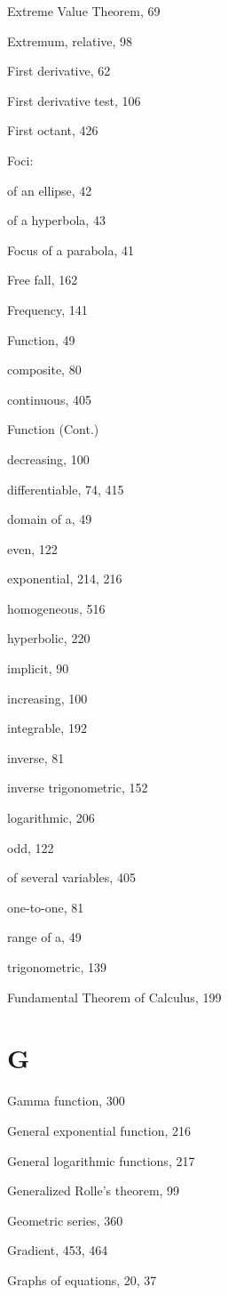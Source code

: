 \documentclass[10pt]{article}
\begin{document}
Extreme Value Theorem, 69

Extremum, relative, 98

First derivative, 62

First derivative test, 106

First octant, 426

Foci:

of an ellipse, 42

of a hyperbola, 43

Focus of a parabola, 41

Free fall, 162

Frequency, 141

Function, 49

composite, 80

continuous, 405

Function (Cont.)

decreasing, 100

differentiable, 74, 415

domain of a, 49

even, 122

exponential, 214, 216

homogeneous, 516

hyperbolic, 220

implicit, 90

increasing, 100

integrable, 192

inverse, 81

inverse trigonometric, 152

logarithmic, 206

odd, 122

of several variables, 405

one-to-one, 81

range of a, 49

trigonometric, 139

Fundamental Theorem of Calculus, 199

\section*{G}
Gamma function, 300

General exponential function, 216

General logarithmic functions, 217

Generalized Rolle's theorem, 99

Geometric series, 360

Gradient, 453, 464

Graphs of equations, 20, 37
\end{document}
